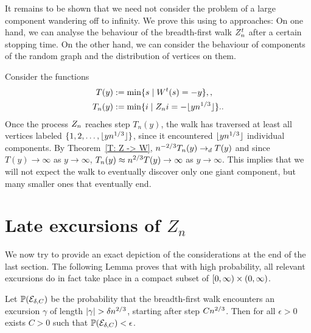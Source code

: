 
It remains to be shown that we need not consider the problem of a large component wandering off to infinity.
We prove this using to approaches:
On one hand, we can analyse the behaviour of the breadth-first walk $Z_n^t$
after a certain stopping time.
On the other hand, 
we can consider the behaviour of components of the random graph
and the distribution of vertices on them.

Consider the functions
\begin{align}
T(y) &:= \min \{s \;|\; W^t(s)=-y\}, \label{E: def T(y)}, \\
T_n(y) &:= \min\{i \;|\; Z_n{i}=-\lfloor yn^{1 / 3}\rfloor \}. \label{E: def Tn(y)}.
\end{align}
Once the process $Z_n$ reaches step $T_n(y)$, 
the walk has traversed at least all vertices labeled $\{1,2,\dots,\lfloor yn^{1 / 3}\rfloor\}$,
since it encountered $\lfloor yn^{1 / 3}\rfloor$ individual components.
By Theorem~\ref{T: Z -> W}, $n^{-2 / 3}T_n(y) \rightarrow_d T(y)$
and since $T(y) \rightarrow \infty$ as $y\rightarrow\infty$,
$T_n(y) \approx n^{2 / 3}T(y) \rightarrow\infty$ as $y\rightarrow \infty$.
This implies that we will not expect the walk to eventually discover only one giant component,
but many smaller ones that eventually end.

\section{Late excursions of $Z_n$}

We now try to provide an exact depiction of the considerations at the end of the last section.
The following Lemma proves that with high probability, all relevant excursions do in fact take place in a compact subset of $[0, \infty) \times (0, \infty)$.

\begin{lemma} \label{L: late excursions}
	Let 
	$\mathbb{P}(\mathcal{E}_{\delta, C})$ 
	be the probability that the breadth-first walk encounters an excursion $\gamma$ of length 
	$|\gamma| > \delta n^{2 / 3}$, starting after step $Cn^{2 / 3}$.
	Then for all $\epsilon>0$ exists $C>0$ such that $\mathbb{P}(\mathcal{E}_{\delta, C}) < \epsilon$. 
\end{lemma}

